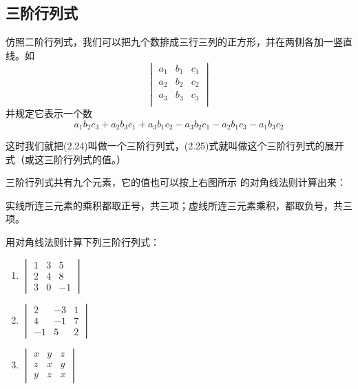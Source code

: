 \subsection{三阶行列式}

仿照二阶行列式，我们可以把九个数排成三行三列的正方形，并在两侧各加一竖直线。如
\begin{equation}
    \begin{vmatrix}
  a_1&b_1&c_1\\a_2&b_2&c_2\\a_3&b_3&c_3\\      
    \end{vmatrix}
\end{equation}
并规定它表示一个数
\begin{equation}
    a_1b_2c_3+a_2b_3c_1+a_3b_1c_2-a_3b_2c_1-a_2b_1c_3-a_1b_3c_2
\end{equation}

这时我们就把(2.24)叫做一个三阶行列式，(2.25)式就叫做这个三阶行列式的展开式（或这三阶行列式的值。）

三阶行列式共有九个元素，它的值也可以按上右图所示
的对角线法则计算出来：

实线所连三元素的乘积都取正号，共三项；虚线所连三元素乘积，都取负号，共三项。

\begin{example}
    用对角线法则计算下列三阶行列式：
\begin{multicols}{3}
\begin{enumerate}
    \item $\begin{vmatrix}
        1&3&5\\2&4&8\\3&0&-1
    \end{vmatrix}$
    \item $\begin{vmatrix}
        2&-3&1\\4&-1&7\\-1&5&2
    \end{vmatrix}$
    \item $\begin{vmatrix}
        x&y&z\\z&x&y\\y&z&x
    \end{vmatrix}$
\end{enumerate} 
\end{multicols}
\end{example}

